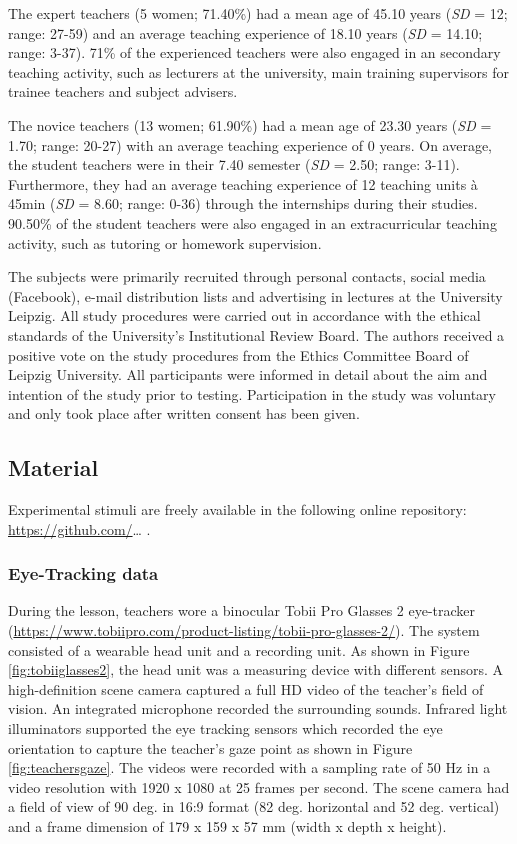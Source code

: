 \documentclass[
  man,floatsintext]{apa6}
\begin{document}
The expert teachers (5 women; 71.40\%) had a mean age of 45.10 years (\emph{SD} = 12; range: 27-59) and an average teaching experience of 18.10 years (\emph{SD} = 14.10; range: 3-37). 71\% of the experienced teachers were also engaged in an secondary teaching activity, such as lecturers at the university, main training supervisors for trainee teachers and subject advisers.

The novice teachers (13 women; 61.90\%) had a mean age of 23.30 years (\emph{SD} = 1.70; range: 20-27) with an average teaching experience of 0 years. On average, the student teachers were in their 7.40 semester (\emph{SD} = 2.50; range: 3-11). Furthermore, they had an average teaching experience of 12 teaching units à 45min (\emph{SD} = 8.60; range: 0-36) through the internships during their studies. 90.50\% of the student teachers were also engaged in an extracurricular teaching activity, such as tutoring or homework supervision.

The subjects were primarily recruited through personal contacts, social media (Facebook), e-mail distribution lists and advertising in lectures at the University Leipzig. All study procedures were carried out in accordance with the ethical standards of the University's Institutional Review Board. The authors received a positive vote on the study procedures from the Ethics Committee Board of Leipzig University. All participants were informed in detail about the aim and intention of the study prior to testing. Participation in the study was voluntary and only took place after written consent has been given.

\hypertarget{material}{%
\subsection{Material}\label{material}}

Experimental stimuli are freely available in the following online repository: \url{https://github.com/}\ldots{} .

\hypertarget{eye-tracking-data}{%
\subsubsection{Eye-Tracking data}\label{eye-tracking-data}}

During the lesson, teachers wore a binocular Tobii Pro Glasses 2 eye-tracker (\url{https://www.tobiipro.com/product-listing/tobii-pro-glasses-2/}). The system consisted of a wearable head unit and a recording unit. As shown in Figure \ref{fig:tobiiglasses2}, the head unit was a measuring device with different sensors. A high-definition scene camera captured a full HD video of the teacher's field of vision. An integrated microphone recorded the surrounding sounds. Infrared light illuminators supported the eye tracking sensors which recorded the eye orientation to capture the teacher's gaze point as shown in Figure \ref{fig:teachersgaze}. The videos were recorded with a sampling rate of 50 Hz in a video resolution with 1920 x 1080 at 25 frames per second. The scene camera had a field of view of 90 deg. in 16:9 format (82 deg. horizontal and 52 deg. vertical) and a frame dimension of 179 x 159 x 57 mm (width x depth x height).
\end{document}
